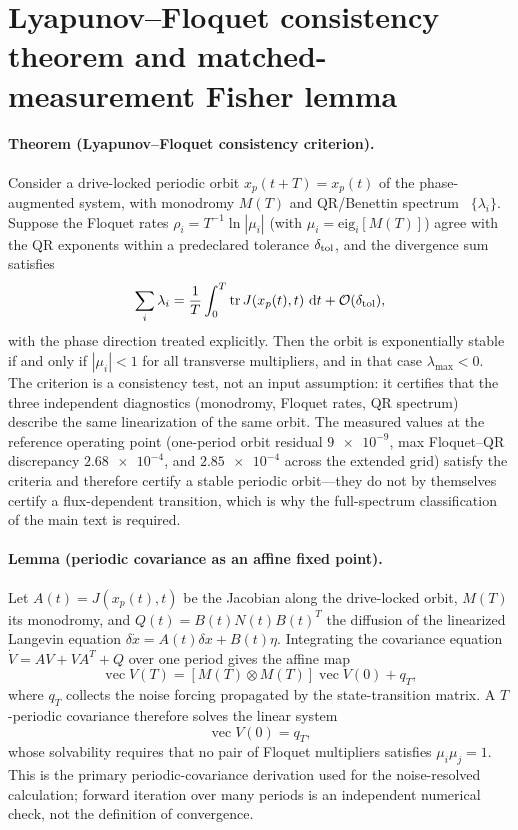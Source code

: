 \documentclass[aip,cha,reprint]{revtex4-2}
\newcommand{\dd}{\,\mathrm{d}}
\begin{document}
\section{Lyapunov--Floquet consistency theorem and matched-measurement Fisher lemma}
\label{sec:theorems}

\paragraph{Theorem (Lyapunov--Floquet consistency criterion).}
Consider a drive-locked periodic orbit $x_p(t+T)=x_p(t)$ of the
phase-augmented system, with monodromy $M(T)$ and QR/Benettin spectrum~\cite{benettin1980,wolf1985,eckmann1985}
$\{\lambda_i\}$. Suppose the Floquet rates $\rho_i=T^{-1}\ln|\mu_i|$ (with
$\mu_i=\mathrm{eig}_i[M(T)]$) agree with the QR exponents within a predeclared
tolerance $\delta_{\rm tol}$, and the divergence sum satisfies
\begin{equation}
 \sum_i\lambda_i=\frac1T\int_0^T\operatorname{tr}J(x_p(t),t)\,\dd t
 +\mathcal{O}(\delta_{\rm tol}),
\label{eq:divergence-theorem}
\end{equation}
with the phase direction treated explicitly. Then the orbit is exponentially
stable if and only if $|\mu_i|<1$ for all transverse multipliers, and in that
case $\lambda_{\max}<0$. The criterion is a consistency test, not an input
assumption: it certifies that the three independent diagnostics (monodromy,
Floquet rates, QR spectrum) describe the same linearization of the same
orbit. The measured values at the reference operating point (one-period orbit
residual $\num{9e-9}$, max Floquet--QR discrepancy $\num{2.68e-4}$, and
$\num{2.85e-4}$ across the
extended grid) satisfy the criteria and therefore
certify a stable periodic orbit---they do not by themselves certify a
flux-dependent transition, which is why the full-spectrum classification of the
main text is required.

\paragraph{Lemma (periodic covariance as an affine fixed point).}
Let $A(t)=J(x_p(t),t)$ be the Jacobian along the drive-locked orbit, $M(T)$ its
monodromy, and $Q(t)=B(t)N(t)B(t)^T$ the diffusion of the linearized Langevin
equation $\delta\dot x=A(t)\delta x+B(t)\eta$. Integrating the covariance
equation $\dot V=AV+VA^T+Q$ over one period gives the affine map
\begin{equation}
 \operatorname{vec}V(T)=[M(T)\otimes M(T)]\operatorname{vec}V(0)+q_T,
\label{eq:cov-affine}
\end{equation}
where $q_T$ collects the noise forcing propagated by the state-transition
matrix. A $T$-periodic covariance therefore solves the linear system
\begin{equation}
 [I-M(T)\otimes M(T)]\operatorname{vec}V(0)=q_T,
\label{eq:cov-fixed-point}
\end{equation}
whose solvability requires that no pair of Floquet multipliers satisfies
$\mu_i\mu_j=1$. This is the primary periodic-covariance derivation used for the
noise-resolved calculation; forward iteration over many periods is an
independent numerical check, not the definition of convergence.
\end{document}
